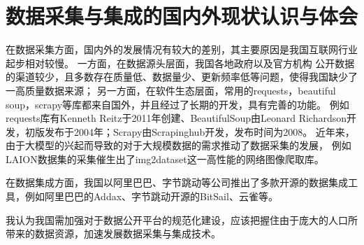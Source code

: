 \section{数据采集与集成的国内外现状认识与体会}

在数据采集方面，国内外的发展情况有较大的差别，其主要原因是我国互联网行业起步相对较慢。
一方面，在数据源头层面，我国各地政府以及官方机构
公开数据的渠道较少，且多数存在质量低、数据量少、更新频率低等问题，使得我国缺少了一高质量数据来源；
另一方面，在软件生态层面，常用的requests，beautiful soup，scrapy等库都来自国外，并且经过了长期的开发，具有完善的功能。
例如requests库有Kenneth Reitz于2011年创建、BeautifulSoup由Leonard Richardson开发，初版发布于2004年；Scrapy由Scrapinghub开发，发布时间为2008。
近年来，由于大模型的兴起而导致的对于大规模数据的需求推动了数据采集的发展，
例如LAION数据集的采集催生出了img2dataset这一高性能的网络图像爬取库。


在数据集成方面，我国以阿里巴巴、字节跳动等公司推出了多款开源的数据集成工具，例如阿里巴巴的Addax、字节跳动开源的BitSail、云雀等。

我认为我国需加强对于数据公开平台的规范化建设，应该把握住由于庞大的人口所带来的数据资源，加速发展数据采集与集成技术。